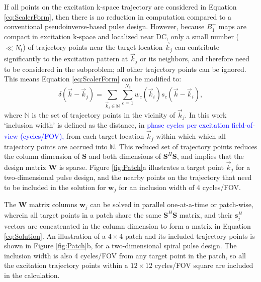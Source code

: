\par If all points on the excitation k-space trajectory are considered in Equation \ref{eq:ScalerForm},
then there is no reduction in computation compared to a conventional pseudoinverse-based pulse design.
However, because $B_1^+$ maps are compact in excitation k-space and localized near DC,
only a small number ($\ll N_t$) of trajectory points near the target location $\vec{k}_j$ can contribute significantly
to the excitation pattern at $\vec{k}_j$ or its neighbors, 
and therefore need to be considered in the subproblem;
all other trajectory points can be ignored.
This means Equation \ref{eq:ScalerForm} can be modified to:
\begin{equation}
\delta(\vec{k}-\vec{k}_j) = \sum_{\vec{k}_i \in \mathbb{N}}\sum_{c=1}^{N_c} w_c(\vec{k}_i) s_c(\vec{k}-\vec{k}_i),
\end{equation} 
where $\mathbb{N}$ is the set of trajectory points in the vicinity of $\vec{k}_j$. 
In this work `inclusion width' is defined as the distance, 
in \textcolor{blue}{phase cycles per excitation field-of-view (cycles/FOV), } 
from each target location $\vec{k}_j$ within which which all trajectory points are accrued into $\mathbb{N}$.
This reduced set of trajectory points reduces the column dimension of $\bm{S}$
and both dimensions of $\bm{S}^H\bm{S}$,
and implies that the design matrix $\bm{W}$ is sparse.
Figure \ref{fig:Patch}a illustrates a target point $\vec{k}_j$ for a two-dimensional pulse design, 
and the nearby points on the trajectory that need to be included in the solution for $\bm{w}_j$
for an inclusion width of 4 cycles/FOV.

\par The $\bm{W}$ matrix columns $\bm{w}_j$ can be solved in parallel one-at-a-time or patch-wise, 
wherein all target points in a patch share the same $\bm{S}^{H}\bm{S}$ matrix,
and their $\bm{s}_j^H$ vectors are concatenated in the column dimension
to form a matrix in Equation \ref{eq:Solution}. 
An illustration of a $4 \times 4$ patch and its included trajectory points is shown in Figure \ref{fig:Patch}b,
for a two-dimensional spiral pulse design. 
The inclusion width is also 4 cycles/FOV from any target point in the patch, 
so all the excitation trajectory points within a $12 \times 12$ cycles/FOV square are included in the calculation. 

